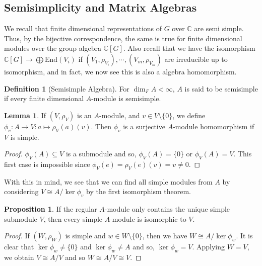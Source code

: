 \documentclass[]{article}
\theoremstyle{definition}
\theoremstyle{definition}
\newtheorem{definition}{Definition}[section]
\newtheorem{lemma}{Lemma}[section]
\newtheorem{proposition}{Proposition}[section]
\begin{document}
\subsection{Semisimplicity and Matrix Algebras}

We recall that finite dimensional representations of \(G\) over \(\mathbb{C}\) 
are semi simple. Thus, by the bijective correspondence, the same is true 
for finite dimensional modules over the group algebra \(\mathbb{C}[G]\).
Also recall that we have the isomorphism 
\(\mathbb{C}[G] \to \bigoplus \text{End}(V_i)\) if \((V_1, \rho_{V_i}), \cdots, 
(V_m, \rho_{V_m})\) are irreducible up to isomorphism, and in fact, we 
now see this is also a algebra homomorphism.

\begin{definition}[Semisimple Algebra]
  For \(\dim_F A < \infty\), \(A\) is said to be semisimple if 
  every finite dimensional \(A\)-module is semisimple.
\end{definition}

\begin{lemma}
  If \((V, \rho_V)\) is an \(A\)-module, and \(v \in V \setminus \{0\}\), we 
  define \(\phi_v : A \to V : a \mapsto \rho_V(a)(v)\). Then \(\phi_v\) is a 
  surjective \(A\)-module homomorphism if \(V\) is simple.
\end{lemma}
\begin{proof}
  \(\phi_V(A) \subseteq V\) is a submodule and so, \(\phi_V(A) = \{0\}\) or 
  \(\phi_V(A) = V\). This first case is impossible since \(\phi_V(e) = 
  \rho_V(e)(v) = v \neq 0\).
\end{proof}

With this in mind, we see that we can find all simple modules from \(A\) by 
considering \(V \cong A / \ker \phi_v\) by the first isomorphism theorem.

\begin{proposition}
  If the regular \(A\)-module only contains the unique simple submodule \(V\), then 
  every simple \(A\)-module is isomorphic to \(V\).
\end{proposition}
\begin{proof}
  If \((W, \rho_W)\) is simple and \(w \in W \setminus \{0\}\), then 
  we have \(W \cong A / \ker \phi_w\). It is clear that \(\ker \phi_w \neq \{0\}\) 
  and \(\ker \phi_w \neq A\) and so, \(\ker \phi_w = V\). Applying 
  \(W = V\), we obtain \(V \cong A / V\) and so \(W \cong A / V \cong V\).
\end{proof}
\end{document}
